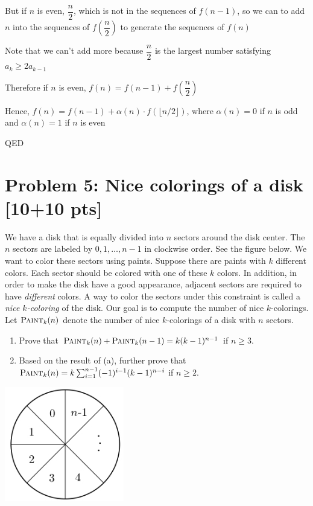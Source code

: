\documentclass[11pt,twoside]{article}
\newcommand{\problem}[1]{\section*{Problem #1}}
\begin{document}
But if $n$ is even, $\dfrac{n}{2}$, which is not in the sequences of $f(n-1)$, so we can to add $n$ into the sequences of $f(\dfrac{n}{2})$ to generate the sequences of $f(n)$

Note that we can't add more because $\dfrac{n}{2}$ is the largest number satisfying $a_k \geq 2a_{k-1}$

Therefore if $n$ is even, $f(n) = f(n-1)+ f(\dfrac{n}{2})$

Hence, $f(n) = f(n-1) + \alpha(n) \cdot f(\lfloor n/2 \rfloor)$, where $\alpha(n) = 0$ if $n$ is odd and $\alpha(n) = 1$ if $n$ is even

QED



\problem{5: Nice colorings of a disk [10+10 pts]} 
We have a disk that is equally divided into $n$ sectors around the disk center.
The $n$ sectors are labeled by $0,1,\dots,n-1$ in clockwise order.
See the figure below.
We want to color these sectors using paints.
Suppose there are paints with $k$ different colors.
Each sector should be colored with one of these $k$ colors.
In addition, in order to make the disk have a good appearance, adjacent sectors are required to have \textit{different} colors.
A way to color the sectors under this constraint is called a \textit{nice $k$-coloring} of the disk.
Our goal is to compute the number of nice $k$-colorings.
Let $\textsc{Paint}_k(n)$ denote the number of nice $k$-colorings of a disk with $n$ sectors.
\begin{enumerate}
    \item Prove that $\textsc{Paint}_k(n) + \textsc{Paint}_k(n-1) = k(k-1)^{n-1}$ if $ n\geq 3$.
    \item Based on the result of (a), further prove that $\textsc{Paint}_k(n) = k \sum_{i=1}^{n-1} (-1)^{i-1} (k-1)^{n-i}$ if $n \geq 2$.
\end{enumerate}

\begin{center}
    \includegraphics[height=5cm]{hw-fig-sector.jpg}
\end{center}
\end{document}
